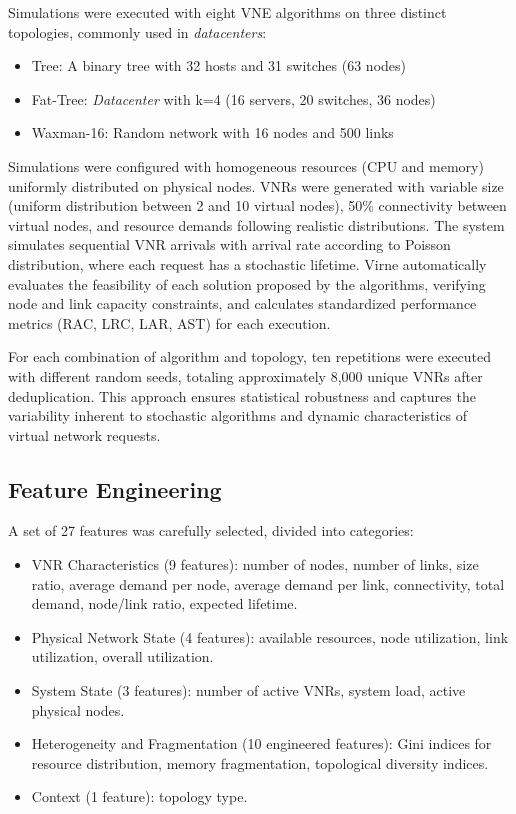 \documentclass[a4paper,twoside]{article}
\begin{document}
Simulations were executed with eight VNE algorithms on three distinct topologies, commonly used in \textit{datacenters}:

\begin{itemize}
    \item Tree: A binary tree with 32 hosts and 31 switches (63 nodes)
    \item Fat-Tree: \textit{Datacenter} with k=4 (16 servers, 20 switches, 36 nodes)
    \item Waxman-16: Random network with 16 nodes and 500 links
\end{itemize}

Simulations were configured with homogeneous resources (CPU and memory) uniformly distributed on physical nodes. VNRs were generated with variable size (uniform distribution between 2 and 10 virtual nodes), 50\% connectivity between virtual nodes, and resource demands following realistic distributions. The system simulates sequential VNR arrivals with arrival rate according to Poisson distribution, where each request has a stochastic lifetime. Virne automatically evaluates the feasibility of each solution proposed by the algorithms, verifying node and link capacity constraints, and calculates standardized performance metrics (RAC, LRC, LAR, AST) for each execution.

For each combination of algorithm and topology, ten repetitions were executed with different random seeds, totaling approximately 8,000 unique VNRs after deduplication. This approach ensures statistical robustness and captures the variability inherent to stochastic algorithms and dynamic characteristics of virtual network requests.

\subsection{Feature Engineering}

A set of 27 features was carefully selected, divided into categories:

\begin{itemize}
    \item VNR Characteristics (9 features): number of nodes, number of links, size ratio, average demand per node, average demand per link, connectivity, total demand, node/link ratio, expected lifetime.

    \item Physical Network State (4 features): available resources, node utilization, link utilization, overall utilization.

    \item System State (3 features): number of active VNRs, system load, active physical nodes.

    \item Heterogeneity and Fragmentation (10 engineered features): Gini indices for resource distribution, memory fragmentation, topological diversity indices.

    \item Context (1 feature): topology type.

\end{itemize}
\end{document}
